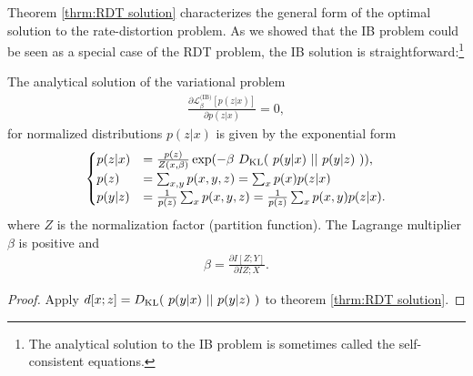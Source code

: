 Theorem \ref{thrm:RDT solution} characterizes the general form of the optimal solution to the rate-distortion problem. As we showed that the IB problem could be seen as a special case of the RDT problem, the IB solution is straightforward:\footnote{The analytical solution to the IB problem is sometimes called the self-consistent equations.}
\begin{theorem}\label{thrm:IB solution}
	The analytical solution of the variational problem
	\begin{align}
		\frac{\partial \mathcal{L}_{\beta}^{\text{(IB)}}[p(z|x)]}{\partial p(z|x)} = 0,
	\end{align}
	for normalized distributions $p(z|x)$ is given by the exponential form
	\begin{align}
		\begin{cases}
		p(z|x) &= \frac{p(z)}{Z(x,\beta)}\exp (-\beta ~D_{\mathrm{KL}}{\left(~p(y|x)~ ||~ p(y|z)~ \right)}),\\
		p(z) &= \sum_{x,y} p(x,y,z) = \sum_x p(x)p(z|x)  \\
		p(y|z) &= \frac{1}{p(z)}\sum_x p(x,y,z) = \frac{1}{p(z)}\sum_x p(x,y) p(z|x).
		\end{cases}
	\end{align}
	where $Z$ is the normalization factor (partition function).  The Lagrange multiplier $\beta$ is positive and
	\begin{align}
		\beta = \frac{\partial I[Z;Y]}{\partial I{Z;X}}.
	\end{align}
\end{theorem}
\begin{proof}
	Apply $d[x;z] = D_{\mathrm{KL}}{\left(~p(y|x)~ ||~ p(y|z)~ \right)}$ to theorem \ref{thrm:RDT solution}.
\end{proof}